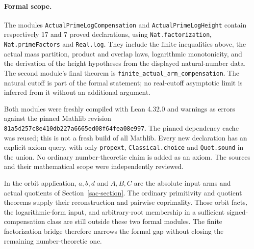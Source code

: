 \paragraph{Formal scope.}
The modules \texttt{ActualPrimeLogCompensation} and
\texttt{ActualPrimeLogHeight} contain respectively 17 and 7 proved
declarations, using \texttt{Nat.factorization}, \texttt{Nat.primeFactors}
and \texttt{Real.log}. They include the finite inequalities above,
the actual mass partition, product and overlap laws, logarithmic
monotonicity, and the derivation of the height hypotheses from the
displayed natural-number data. The second module's final theorem is
\texttt{finite\_actual\_arm\_compensation}. The natural cutoff is part
of the formal statement; no real-cutoff asymptotic limit is inferred
from it without an additional argument.

Both modules were freshly compiled with Lean 4.32.0 and warnings as
errors against the pinned Mathlib revision
\texttt{81a5d257c8e410db227a6665ed08f64fea08e997}.
The pinned dependency cache was reused; this is not a fresh build of
all Mathlib. Every new declaration has an explicit axiom query, with
only \texttt{propext}, \texttt{Classical.choice} and \texttt{Quot.sound}
in the union. No ordinary number-theoretic claim is added as an axiom.
The sources and their mathematical scope were independently reviewed.

In the orbit application, $a,b,d$ and $A,B,C$ are the absolute input
arms and actual quotients of Section~\ref{sac-section}. The ordinary
primitivity and quotient theorems supply their reconstruction and
pairwise coprimality. Those orbit facts, the logarithmic-form input,
and arbitrary-root membership in a sufficient signed-compensation
class are still outside these two formal modules. The finite
factorization bridge therefore narrows the formal gap without
closing the remaining number-theoretic one.
